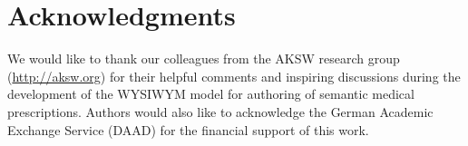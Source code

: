 \documentclass[journal]{IEEEtran}
\begin{document}
\section*{Acknowledgments}
We would like to thank our colleagues from the AKSW research group (\url{http://aksw.org}) for their helpful comments and inspiring discussions during the development of the WYSIWYM model for authoring of semantic medical prescriptions.
Authors would also like to acknowledge the German Academic Exchange Service (DAAD) for the financial support of this work.




\end{document}
